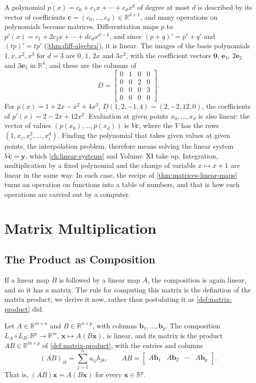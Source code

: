 A polynomial $p(x)=c_0+c_1x+\cdots+c_dx^d$ of degree at most $d$ is described by its vector of coefficients $\mathbf c=(c_0,\ldots,c_d)\in\mathbb R^{d+1}$, and many operations on polynomials become matrices. Differentiation maps $p$ to $p'(x)=c_1+2c_2x+\cdots+dc_dx^{d-1}$, and since $(p+q)'=p'+q'$ and $(tp)'=tp'$ (\cref{thm:diff-algebra}), it is linear. The images of the basis polynomials $1,x,x^2,x^3$ for $d=3$ are $0$, $1$, $2x$ and $3x^2$, with the coefficient vectors $\mathbf 0$, $\mathbf e_1$, $2\mathbf e_2$ and $3\mathbf e_3$ in $\mathbb R^4$, and these are the columns of
\[
D=\begin{bmatrix}0&1&0&0\\0&0&2&0\\0&0&0&3\\0&0&0&0\end{bmatrix}.
\]
For $p(x)=1+2x-x^2+4x^3$, $D(1,2,-1,4)=(2,-2,12,0)$, the coefficients of $p'(x)=2-2x+12x^2$. Evaluation at given points $x_0,\ldots,x_d$ is also linear: the vector of values $(p(x_0),\ldots,p(x_d))$ is $V\mathbf c$, where the  $V$ has the rows $(1,x_i,x_i^2,\ldots,x_i^d)$. Finding the polynomial that takes given values at given points, the interpolation problem, therefore means solving the linear system $V\mathbf c=\mathbf y$, which \cref{ch:linear-systems} and Volume~XI take up. Integration, multiplication by a fixed polynomial and the change of variable $x\mapsto x+1$ are linear in the same way. In each case, the recipe of \cref{thm:matrices-linear-maps} turns an operation on functions into a table of numbers, and that is how such operations are carried out by a computer.

\section{Matrix Multiplication}
\label{sec:matrix-multiplication}

\subsection{The Product as Composition}

If a linear map $B$ is followed by a linear map $A$, the composition is again linear, and so it has a matrix. The rule for computing this matrix is the definition of the matrix product; we derive it now, rather than postulating it as \cref{def:matrix-product} did.

\begin{theorem}
\label{thm:product-composition}
Let $A\in\mathbb R^{m\times n}$ and $B\in\mathbb R^{n\times p}$, with columns $\mathbf b_1,\ldots,\mathbf b_p$. The composition $L_A\circ L_B\colon\mathbb R^p\to\mathbb R^m$, $\mathbf x\mapsto A(B\mathbf x)$, is linear, and its matrix is the product $AB\in\mathbb R^{m\times p}$ of \cref{def:matrix-product}, with the entries and columns
\[
(AB)_{ik}=\sum_{j=1}^na_{ij}b_{jk},\qquad AB=\begin{bmatrix}A\mathbf b_1&A\mathbf b_2&\cdots&A\mathbf b_p\end{bmatrix}.
\]
That is, $(AB)\mathbf x=A(B\mathbf x)$ for every $\mathbf x\in\mathbb R^p$.
\end{theorem}

